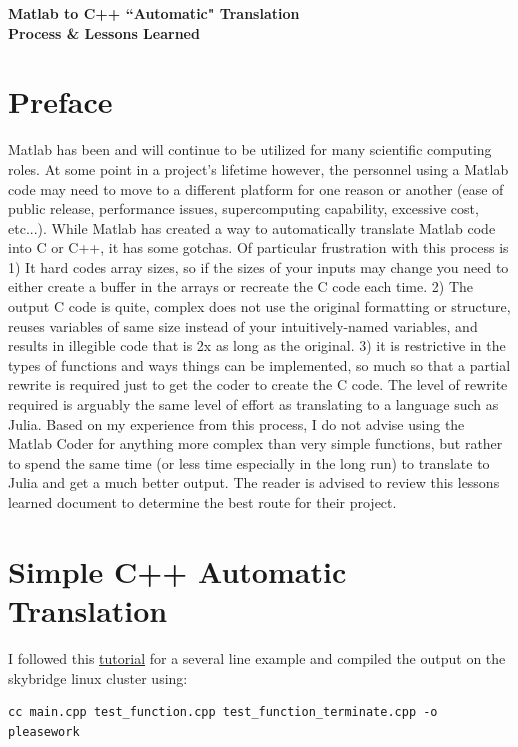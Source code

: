\documentclass{article}
\begin{document}
\begin{center}
\begin{LARGE}
\textbf{Matlab to C++ ``Automatic" Translation \\ Process \& Lessons Learned }\\
\end{LARGE}
\vspace{8pt}
\end{center}

\section{Preface}

Matlab has been and will continue to be utilized for many scientific computing roles.  At some point in a project's lifetime however, the personnel using a Matlab code may need to move to a different platform for one reason or another (ease of public release, performance issues, supercomputing capability, excessive cost, etc...).  While Matlab has created a way to automatically translate Matlab code into C or C++, it has some gotchas.  Of particular frustration with this process is 1) It hard codes array sizes, so if the sizes of your inputs may change you need to either create a buffer in the arrays or recreate the C code each time. 2) The output C code is quite, complex does not use the original formatting or structure, reuses variables of same size instead of your intuitively-named variables, and results in illegible code that is 2x as long as the original. 3) it is restrictive in the types of functions and ways things can be implemented, so much so that a partial rewrite is required just to get the coder to create the C code.  The level of rewrite required is arguably the same level of effort as translating to a language such as Julia. Based on my experience from this process, I do not advise using the Matlab Coder for anything more complex than very simple functions, but rather to spend the same time (or less time especially in the long run) to translate to Julia and get a much better output.  The reader is advised to review this lessons learned document to determine the best route for their project. 

\section{Simple C++ Automatic Translation}
I followed this \href{https://www.mathworks.com/videos/automatically-converting-matlab-code-to-c-code-96483.html}{tutorial} for a several line example and compiled the output on the skybridge linux cluster using:
\begin{verbatim}
cc main.cpp test_function.cpp test_function_terminate.cpp -o pleasework
\end{verbatim}
\end{document}
